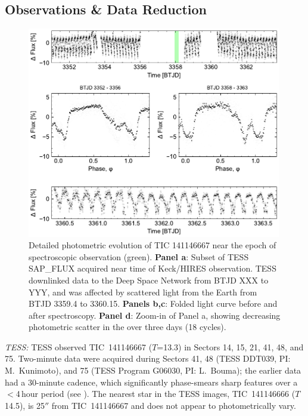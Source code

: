 \documentclass{nature3}
\begin{document}
\newpage
\begin{methods}

\renewcommand{\figurename}{Extended Data Figure}
\renewcommand{\tablename}{Extended Data Table}
\setcounter{table}{0}  
\setcounter{figure}{0}  

\subsection{Observations \& Data Reduction}

\begin{figure}[!b]
  \centering
  \includegraphics[width=0.99\textwidth]{figures/sf1.pdf}
  \caption{Detailed photometric evolution of TIC 141146667 near the
  epoch of spectroscopic observation (green). 
  {\bf Panel a}: Subset of TESS SAP\_FLUX acquired near time of
  Keck/HIRES observation.
  TESS downlinked data to the Deep Space Network from BTJD XXX to
  YYY, and was affected by scattered light from the Earth from BTJD
  3359.4 to 3360.15.
  {\bf Panels b,c}: Folded light curve before and after spectroscopy.
  {\bf Panel d}: Zoom-in of Panel a, showing decreasing photometric
  scatter in the over three days (18 cycles).
  }
  \label{fig:fulllc}
\end{figure}

{\it TESS:} TESS observed TIC~141146667 ($T$=13.3) in Sectors 14, 15, 21, 41, 48,
and 75.  Two-minute data were acquired during Sectors 41, 48 (TESS
DDT039, PI: M.~Kunimoto), and 75 (TESS Program G06030, PI: L.~Bouma);
the earlier data had a 30-minute cadence, which significantly
phase-smears sharp features over a $<$4\,hour period (see
\cite{Gunther2022}).
The nearest star in the TESS images, TIC~141146666 ($T$14.5), is 
25$''$ from TIC~141146667 and does not appear to photometrically vary.


\end{methods}
\end{document}
